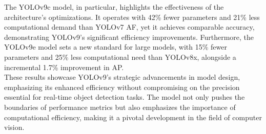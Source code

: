             The YOLOv9c model, in particular, highlights the effectiveness of the architecture's optimizations. It operates with 42\% fewer parameters and 21\% less computational demand than YOLOv7 AF, yet it achieves comparable accuracy, demonstrating YOLOv9's significant efficiency improvements. Furthermore, the YOLOv9e model sets a new standard for large models, with 15\% fewer parameters and 25\% less computational need than YOLOv8x, alongside a incremental 1.7\% improvement in AP. \\
            \vspace{3mm}
            These results showcase YOLOv9's strategic advancements in model design, emphasizing its enhanced efficiency without compromising on the precision essential for real-time object detection tasks. The model not only pushes the boundaries of performance metrics but also emphasizes the importance of computational efficiency, making it a pivotal development in the field of computer vision.
